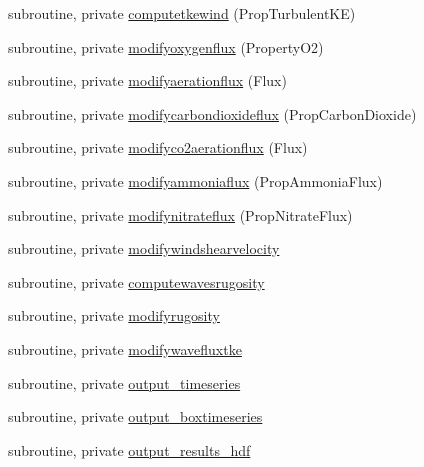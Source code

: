 \begin{DoxyCompactItemize}
\item 
subroutine, private \mbox{\hyperlink{namespacemoduleinterfacewaterair_afa753f72a101e83d20369a3801986adb}{computetkewind}} (Prop\+Turbulent\+KE)
\item 
subroutine, private \mbox{\hyperlink{namespacemoduleinterfacewaterair_ad4e148f79fe842f02dfc2fd7eb424091}{modifyoxygenflux}} (Property\+O2)
\item 
subroutine, private \mbox{\hyperlink{namespacemoduleinterfacewaterair_a9e9d9c5604753ebdf47d735d1c6b2fe4}{modifyaerationflux}} (Flux)
\item 
subroutine, private \mbox{\hyperlink{namespacemoduleinterfacewaterair_a562697e89f9cb3b375137d30b5b565eb}{modifycarbondioxideflux}} (Prop\+Carbon\+Dioxide)
\item 
subroutine, private \mbox{\hyperlink{namespacemoduleinterfacewaterair_ad16fde1df2013d74710f42901a89754e}{modifyco2aerationflux}} (Flux)
\item 
subroutine, private \mbox{\hyperlink{namespacemoduleinterfacewaterair_a8f1f7fa64a06041e2cb84a386c86e9e1}{modifyammoniaflux}} (Prop\+Ammonia\+Flux)
\item 
subroutine, private \mbox{\hyperlink{namespacemoduleinterfacewaterair_ac260263b243a28d2d9eb0dce7188d3b0}{modifynitrateflux}} (Prop\+Nitrate\+Flux)
\item 
subroutine, private \mbox{\hyperlink{namespacemoduleinterfacewaterair_a067a8627bd218eba128377b9cca8031f}{modifywindshearvelocity}}
\item 
subroutine, private \mbox{\hyperlink{namespacemoduleinterfacewaterair_abb9a2be6b590714a3c5b58da190ce52f}{computewavesrugosity}}
\item 
subroutine, private \mbox{\hyperlink{namespacemoduleinterfacewaterair_aa7f512949a9b145b55378017e58558a7}{modifyrugosity}}
\item 
subroutine, private \mbox{\hyperlink{namespacemoduleinterfacewaterair_a2494cba9b6646ce732323f31ef820a97}{modifywavefluxtke}}
\item 
subroutine, private \mbox{\hyperlink{namespacemoduleinterfacewaterair_a739b5f50c0652ff91c9f777fbf68729f}{output\+\_\+timeseries}}
\item 
subroutine, private \mbox{\hyperlink{namespacemoduleinterfacewaterair_a8c2f4a754ac1aeb4a3a8045d639e609f}{output\+\_\+boxtimeseries}}
\item 
subroutine, private \mbox{\hyperlink{namespacemoduleinterfacewaterair_af0bc1dab0d7eafb5b7f4996d24e4d0bf}{output\+\_\+results\+\_\+hdf}}
\item 

\end{DoxyCompactItemize}
